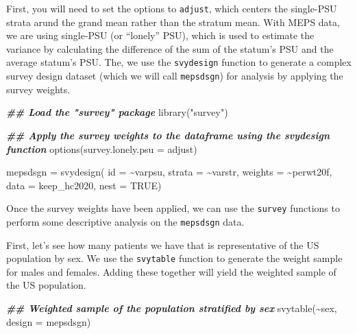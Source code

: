 \documentclass[
]{book}
\newenvironment{Shaded}{\begin{snugshade}}{\end{snugshade}}
\newcommand{\AttributeTok}[1]{\textcolor[rgb]{0.77,0.63,0.00}{#1}}
\newcommand{\ConstantTok}[1]{\textcolor[rgb]{0.00,0.00,0.00}{#1}}
\newcommand{\DocumentationTok}[1]{\textcolor[rgb]{0.56,0.35,0.01}{\textbf{\textit{#1}}}}
\newcommand{\FunctionTok}[1]{\textcolor[rgb]{0.00,0.00,0.00}{#1}}
\newcommand{\NormalTok}[1]{#1}
\newcommand{\OtherTok}[1]{\textcolor[rgb]{0.56,0.35,0.01}{#1}}
\newcommand{\SpecialCharTok}[1]{\textcolor[rgb]{0.00,0.00,0.00}{#1}}
\newcommand{\StringTok}[1]{\textcolor[rgb]{0.31,0.60,0.02}{#1}}
\begin{document}
First, you will need to set the options to \texttt{adjust}, which centers the single-PSU strata arund the grand mean rather than the stratum mean. With MEPS data, we are using single-PSU (or ``lonely'' PSU), which is used to estimate the variance by calculating the difference of the sum of the statum's PSU and the average statum's PSU. The, we use the \texttt{svydesign} function to generate a complex survey design dataset (which we will call \texttt{mepsdsgn}) for analysis by applying the survey weights.

\begin{Shaded}
\begin{Highlighting}[]
\DocumentationTok{\#\# Load the "survey" package}
\FunctionTok{library}\NormalTok{(}\StringTok{"survey"}\NormalTok{)}

\DocumentationTok{\#\# Apply the survey weights to the dataframe using the svydesign function}
\FunctionTok{options}\NormalTok{(}\AttributeTok{survey.lonely.psu =} \StringTok{\textquotesingle{}adjust\textquotesingle{}}\NormalTok{)}

\NormalTok{mepsdsgn }\OtherTok{=} \FunctionTok{svydesign}\NormalTok{(}
  \AttributeTok{id =} \SpecialCharTok{\textasciitilde{}}\NormalTok{varpsu,}
  \AttributeTok{strata =} \SpecialCharTok{\textasciitilde{}}\NormalTok{varstr,}
  \AttributeTok{weights =} \SpecialCharTok{\textasciitilde{}}\NormalTok{perwt20f,}
  \AttributeTok{data =}\NormalTok{ keep\_hc2020,}
  \AttributeTok{nest =} \ConstantTok{TRUE}\NormalTok{)}
\end{Highlighting}
\end{Shaded}

Once the survey weights have been applied, we can use the \texttt{survey} functions to perform some descriptive analysis on the \texttt{mepsdsgn} data.

First, let's see how many patients we have that is representative of the US population by sex. We use the \texttt{svytable} function to generate the weight sample for males and females. Adding these together will yield the weighted sample of the US population.

\begin{Shaded}
\begin{Highlighting}[]
\DocumentationTok{\#\# Weighted sample of the population stratified by sex}
\FunctionTok{svytable}\NormalTok{(}\SpecialCharTok{\textasciitilde{}}\NormalTok{sex, }\AttributeTok{design =}\NormalTok{ mepsdsgn)}
\end{Highlighting}
\end{Shaded}
\end{document}
